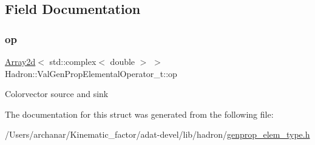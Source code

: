 \subsection{Field Documentation}
\mbox{\label{structHadron_1_1ValGenPropElementalOperator__t_a52ab58302100c2cdb47154082c0a3953}} 
\subsubsection{\texorpdfstring{op}{op}}
{\footnotesize\ttfamily \mbox{\hyperlink{classXMLArray_1_1Array2d}{Array2d}}$<$ std\+::complex$<$ double $>$ $>$ Hadron\+::\+Val\+Gen\+Prop\+Elemental\+Operator\+\_\+t\+::op}

Colorvector source and sink 

The documentation for this struct was generated from the following file\+:\begin{DoxyCompactItemize}
\item 
/\+Users/archanar/\+Kinematic\+\_\+factor/adat-\/devel/lib/hadron/\mbox{\hyperlink{adat-devel_2lib_2hadron_2genprop__elem__type_8h}{genprop\+\_\+elem\+\_\+type.\+h}}\end{DoxyCompactItemize}

